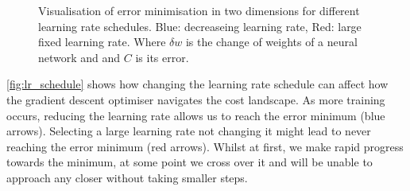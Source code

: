 \begin{figure}
\begin{center}
\caption{Visualisation of error minimisation in two dimensions for different learning rate schedules. Blue: decreaseing learning rate, Red: large fixed learning rate. Where $\delta w$ is the change of weights of a neural network and and $C$ is its error.}
\label{fig:lr_schedule}
\end{center}
\end{figure}

\autoref{fig:lr_schedule} shows how changing the learning rate schedule can affect how the gradient descent optimiser navigates the cost landscape. As more training occurs, reducing the learning rate allows us to reach the error minimum (blue arrows). Selecting a large learning rate not changing it might lead to never reaching the error minimum (red arrows). Whilst at first, we make rapid progress towards the minimum, at some point we cross over it and will be unable to approach any closer without taking smaller steps.

